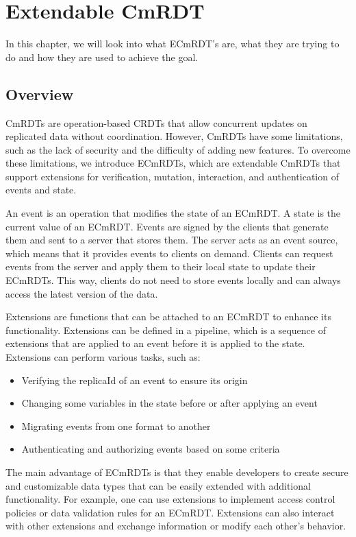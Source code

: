 \documentclass[
	ngerman,
	ruledheaders=section,   %
	class=report,		    %
	thesis={type=bachelor}, %
	accentcolor=9c,			%
	custommargins=true,    %
	marginpar=false,        %
	parskip=half-,          %
	fontsize=11pt,          %
]{tudapub}
\begin{document}
\chapter{Extendable CmRDT}
In this chapter, we will look into what ECmRDT's are, what they are trying to do and how they are used to achieve the goal.

\section{Overview}
CmRDTs are operation-based CRDTs that allow concurrent updates on replicated data without coordination. However, CmRDTs have some limitations, such as the lack of security and the difficulty of adding new features. To overcome these limitations, we introduce ECmRDTs, which are extendable CmRDTs that support extensions for verification, mutation, interaction, and authentication of events and state.

An event is an operation that modifies the state of an ECmRDT. A state is the current value of an ECmRDT. Events are signed by the clients that generate them and sent to a server that stores them. The server acts as an event source, which means that it provides events to clients on demand. Clients can request events from the server and apply them to their local state to update their ECmRDTs. This way, clients do not need to store events locally and can always access the latest version of the data.

Extensions are functions that can be attached to an ECmRDT to enhance its functionality. Extensions can be defined in a pipeline, which is a sequence of extensions that are applied to an event before it is applied to the state. Extensions can perform various tasks, such as:

\begin{itemize}
  \item Verifying the replicaId of an event to ensure its origin
  \item Changing some variables in the state before or after applying an event
  \item Migrating events from one format to another
  \item Authenticating and authorizing events based on some criteria
\end{itemize}

The main advantage of ECmRDTs is that they enable developers to create secure and customizable data types that can be easily extended with additional functionality. For example, one can use extensions to implement access control policies or data validation rules for an ECmRDT. Extensions can also interact with other extensions and exchange information or modify each other’s behavior.
\end{document}
